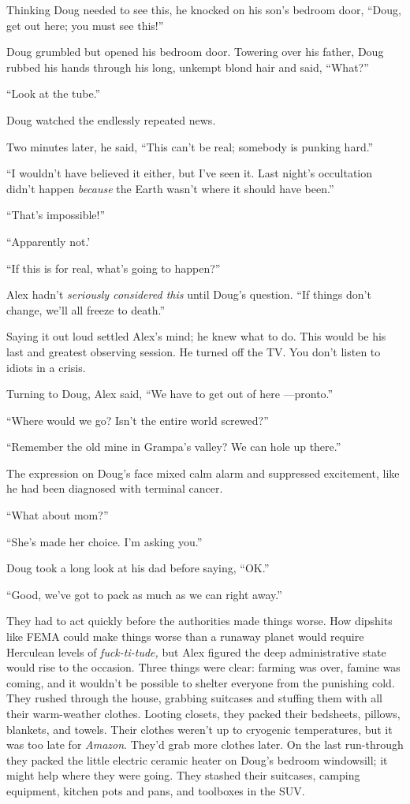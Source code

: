 Thinking Doug needed to see this, he knocked on his son's bedroom door,
``Doug, get out here; you must see this!''

Doug grumbled but opened his bedroom door. Towering over his father,
Doug rubbed his hands through his long, unkempt blond hair and said,
``What?''

``Look at the tube.''

Doug watched the endlessly repeated news.

Two minutes later, he said, ``This can't be real; somebody is punking
hard.''

``I wouldn't have believed it either, but I've seen it. Last night's
occultation didn't happen \emph{because} the Earth wasn't where it
should have been.''

``That's impossible!''

``Apparently not.'

``If this is for real, what's going to happen?''

Alex hadn't \emph{seriously considered this} until Doug's question. ``If
things don't change, we'll all freeze to death.''

Saying it out loud settled Alex's mind; he knew what to do. This would
be his last and greatest observing session. He turned off the TV. You
don't listen to idiots in a crisis.

Turning to Doug, Alex said, ``We have to get out of here ---pronto.''

``Where would we go? Isn't the entire world screwed?''

``Remember the old mine in Grampa's valley? We can hole up there.''

The expression on Doug's face mixed calm alarm and suppressed
excitement, like he had been diagnosed with terminal cancer.

``What about mom?''

``She's made her choice. I'm asking you.''

Doug took a long look at his dad before saying, ``OK.''

``Good, we've got to pack as much as we can right away.''

They had to act quickly before the authorities made things worse. How
dipshits like FEMA could make things worse than a runaway planet would
require Herculean levels of \emph{fuck-ti-tude,} but Alex figured the
deep administrative state would rise to the occasion. Three things were
clear: farming was over, famine was coming, and it wouldn't be possible
to shelter everyone from the punishing cold. They rushed through the
house, grabbing suitcases and stuffing them with all their warm-weather
clothes. Looting closets, they packed their bedsheets, pillows,
blankets, and towels. Their clothes weren't up to cryogenic
temperatures, but it was too late for \emph{Amazon}. They'd grab more
clothes later. On the last run-through they packed the little electric
ceramic heater on Doug's bedroom windowsill; it might help where they
were going. They stashed their suitcases, camping equipment, kitchen
pots and pans, and toolboxes in the SUV.

